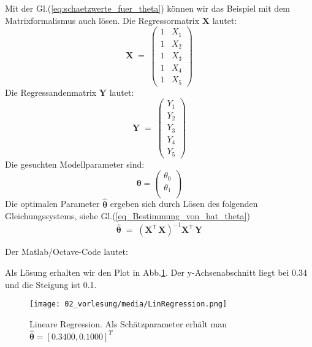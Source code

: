 Mit der Gl.(\ref{eq:schaetzwerte_fuer_theta}) können wir 
das Beispiel mit dem Matrixformalismus auch lösen. 
Die Regressormatrix $\boldsymbol X$ lautet:
\begin{equation}
	\boldsymbol{X} \; = \;
	\left(
	\begin{array}{cc}
		1 & X_1 \\
	    1 & X_2 \\
		1 & X_3 \\
		1 & X_4 \\
		1 & X_5 
	\end{array}
	\right)
\end{equation}
Die Regressandenmatrix $\boldsymbol Y$ lautet:
\begin{equation}
	\boldsymbol{Y} \; = \;
	\left(
	\begin{array}{cc}
		 Y_1 \\
		 Y_2 \\
		 Y_3 \\
		 Y_4 \\
		 Y_5 
	\end{array}
	\right)
\end{equation}
Die gesuchten Modellparameter sind: 
\[
\boldsymbol\theta = \left( 
\begin{array}{cc}
	\theta_0 \\
	\theta_1 \\
\end{array}
\right)
\]
Die optimalen Parameter $\boldsymbol{\hat \theta}$ ergeben sich durch Lösen
des folgenden Gleichungssystems, siehe Gl.(\ref{eq_Bestimmung_von_hat_theta})
\[
	\boldsymbol{\hat \theta} \; = \;
	\left( \mathbf{X}^\mathsf{T}  \, \mathbf{X} \right)^{-1} \mathbf{X}^\mathsf{T} \, \mathbf{Y}
\]

Der Matlab/Octave-Code lautet: 


Als Lösung erhalten wir den Plot in Abb.\ref{fig:LineareRegression}.
Der y-Achsenabschnitt liegt bei 0.34 und die Steigung ist 0.1.
\begin{figure}[!htp]
	\begin{center}
		\texttt{[image: 02\_vorlesung/media/LinRegression.png]}
		\caption{Lineare Regression. 
			Als Schätzparameter erhält man $\hat{\boldsymbol\theta} = [ 0.3400 ,0.1000 ]^T$}
		\label{fig:LineareRegression}
	\end{center}
\end{figure}

